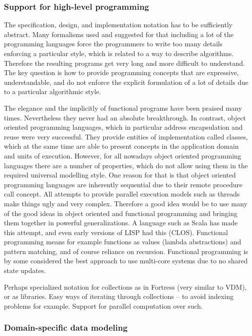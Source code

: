 \subsubsection{Support for high-level programming}

The specification, design, and implementation notation has to be 
sufficiently abstract. Many formalisms used and suggested for that 
including a lot of the programming languages force the programmers 
to write too many details enforcing a particular style, which is 
related to a way to describe algorithms. Therefore the resulting 
programs get very long and more difficult to understand. The key 
question is how to provide programming concepts that are 
expressive, understandable, and do not enforce the explicit 
formulation of a lot of details due to a particular algorithmic 
style.

The elegance and the implicitly of functional programs have been 
praised many times. Nevertheless they never had an absolute 
breakthrough. In contrast, object oriented programming languages, 
which in particular address encapsulation and reuse were very 
successful. They provide entities of implementation called classes, 
which at the same time are able to present concepts in the 
application domain and units of execution. However, for all 
nowadays object oriented programming languages there are a number 
of properties, which do not allow using them in the required 
universal modelling style. One reason for that is that object 
oriented programming languages are inherently sequential due to 
their remote procedure call concept. All attempts to provide 
parallel execution models such as threads make things ugly and very 
complex. Therefore a good idea would be to use many of the good 
ideas in object oriented and functional programming and bringing 
them together in powerful generalizations. A language such as Scala 
has made this attempt, and even early versions of LISP had this 
(CLOS). Functional programming means for example functions as 
values (lambda abstractions) and pattern matching, and of course 
reliance on recursion. Functional programming is by some considered 
the best approach to use multi-core systems due to no shared state 
updates.

Perhaps specialized notation for collections as in Fortress (very similar 
to VDM), or as libraries. Easy ways of iterating through 
collections – to avoid indexing problems for example. Support for 
parallel computation over such.


\subsubsection{Domain-specific data modeling}

